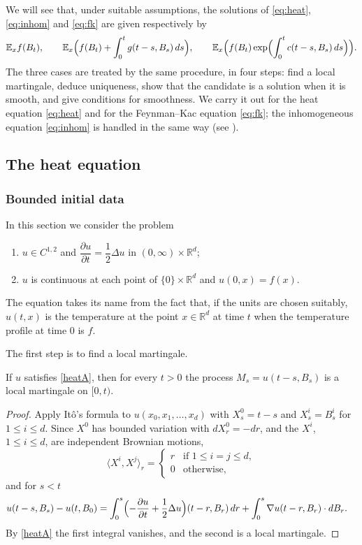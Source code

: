We will see that, under suitable assumptions, the solutions of
\eqref{eq:heat}, \eqref{eq:inhom} and \eqref{eq:fk} are given respectively by
\[
	\mathbb{E}_x f(B_t), \qquad
	\mathbb{E}_x\Bigl(f(B_t) + \int_0^t g(t-s,B_s)\,ds\Bigr), \qquad
	\mathbb{E}_x\Bigl(f(B_t)\exp\Bigl(\int_0^t c(t-s,B_s)\,ds\Bigr)\Bigr).
\]
The three cases are treated by the same procedure, in four steps: find a local
martingale, deduce uniqueness, show that the candidate is a solution when it is
smooth, and give conditions for smoothness. We carry it out for the heat
equation \eqref{eq:heat} and for the Feynman--Kac equation \eqref{eq:fk}; the
inhomogeneous equation \eqref{eq:inhom} is handled in the same way (see
\citet{Durrett1996}).

\subsection{The heat equation}

\subsubsection{Bounded initial data}
In this section we consider the problem
\begin{enumerate}[label=(\Alph*)]
	\item\label{heatA} $u\in C^{1,2}$ and $\dfrac{\partial u}{\partial t} = \dfrac{1}{2}\Delta u$ in $(0,\infty)\times\mathbb{R}^d$;
	\item\label{heatB} $u$ is continuous at each point of $\{0\}\times\mathbb{R}^d$ and $u(0,x) = f(x)$.
\end{enumerate}
The equation takes its name from the fact that, if the units are chosen
suitably, $u(t,x)$ is the temperature at the point $x\in\mathbb{R}^d$ at time
$t$ when the temperature profile at time $0$ is $f$.

The first step is to find a local martingale.

\begin{theorem}\label{th:heat-mart}
	If $u$ satisfies \ref{heatA}, then for every $t>0$ the process
	$M_s = u(t-s,B_s)$ is a local martingale on $[0,t)$.
\end{theorem}
\begin{proof}
	Apply Itô's formula to $u(x_0,x_1,\dots,x_d)$ with $X^0_s = t-s$ and
	$X^i_s = B^i_s$ for $1\leqslant i\leqslant d$. Since $X^0$ has bounded
	variation with $dX^0_r = -dr$, and the $X^i$, $1\leqslant i\leqslant d$, are
	independent Brownian motions,
	\[
		\langle X^i,X^j\rangle_r =
		\begin{cases}
			r & \text{if } 1\leqslant i=j\leqslant d, \\
			0 & \text{otherwise,}
		\end{cases}
	\]
	and for $s<t$
	\begin{align*}
		u(t-s,B_s) - u(t,B_0)
		 & = \int_0^s \Bigl(-\frac{\partial u}{\partial t}
		+ \frac{1}{2}\Delta u\Bigr)(t-r,B_r)\,dr
		+ \int_0^s \nabla u(t-r,B_r)\cdot dB_r .
	\end{align*}
	By \ref{heatA} the first integral vanishes, and the second is a local
	martingale.
\end{proof}

